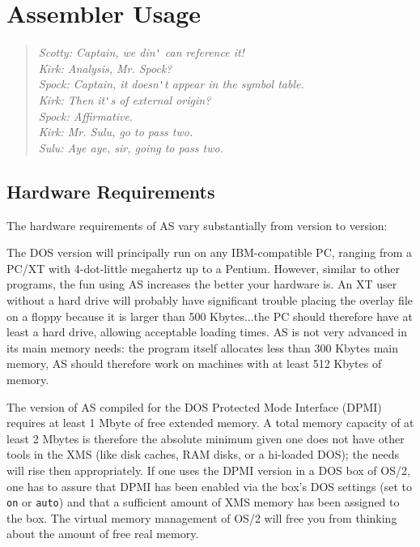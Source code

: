 \documentclass[12pt,twoside]{report}
\newcommand{\tty}[1]{{\tt #1}}
\newcommand{\asname}{{AS}}
\begin{document}

\cleardoublepage
\chapter{Assembler Usage}

\begin{quote}\begin{raggedright}{\it
Scotty: Captain, we din\verb!'! can reference it! \\
Kirk:   Analysis, Mr. Spock? \\
Spock:  Captain, it doesn\verb!'!t appear in the symbol table. \\
Kirk:   Then it\verb!'!s of external origin? \\
Spock:  Affirmative. \\
Kirk:   Mr. Sulu, go to pass two. \\
Sulu:   Aye aye, sir, going to pass two. \\
}\end{raggedright}\end{quote}


\section{Hardware Requirements}

The hardware requirements of \asname{} vary substantially from version to
version:

The DOS version  will principally run on any
IBM-compatible PC, ranging from a PC/XT with 4-dot-little megahertz up to
a Pentium.  However, similar to other programs, the fun using \asname{} increases
the better your hardware is.  An XT user without a hard drive will
probably have significant trouble placing the overlay file on a floppy
because it is larger than 500 Kbytes...the PC should therefore have at
least a hard drive, allowing acceptable loading times.  \asname{} is not very
advanced in its main memory needs: the program itself allocates less than
300 Kbytes main memory, \asname{} should therefore work on machines with at least
512 Kbytes of memory.

The version of \asname{}  compiled for the DOS Protected
Mode Interface (DPMI) requires at least 1 Mbyte of free extended memory.
A total memory capacity of at least 2 Mbytes is therefore the absolute
minimum given one does not have other tools in the XMS (like disk caches,
RAM disks, or a hi-loaded DOS); the needs will rise then appropriately.
If one uses the DPMI version in a DOS box of OS/2, one has to assure that
DPMI has been enabled via the box's DOS settings (set to \tty{on} or
\tty{auto}) and that a sufficient amount of XMS memory has been assigned
to the box.  The virtual memory management of OS/2 will free you
from thinking about the amount of free real memory.
\end{document}
